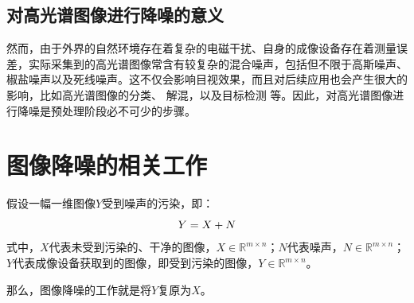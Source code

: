 \documentclass[12pt, a4paper]{article}
\begin{document}
\subsection{对高光谱图像进行降噪的意义}
\par 然而，由于外界的自然环境存在着复杂的电磁干扰、自身的成像设备存在着测量误差，实际采集到的高光谱图像常含有较复杂的混合噪声，包括但不限于高斯噪声、椒盐噪声以及死线噪声。这不仅会影响目视效果，而且对后续应用也会产生很大的影响，比如高光谱图像的分类\cite{further-use-1}、 解混\cite{further-use-2}，以及目标检测\cite{further-use-3} 等。因此，对高光谱图像进行降噪是预处理阶段必不可少的步骤。
\newpage
\section{图像降噪的相关工作}\label{research-route}
\par 假设一幅一维图像$Y$受到噪声的污染，即：
\begin{equation}
\centering
Y = X + N
\label{ori-equation}
\end{equation}
式中，$X$代表未受到污染的、干净的图像，$X \in \mathbb{R}^{m \times n}$；$N$代表噪声，$N \in \mathbb{R}^{m \times n}$；$Y$代表成像设备获取到的图像，即受到污染的图像，$Y \in \mathbb{R}^{m \times n}$。
\par 那么，图像降噪的工作就是将$Y$复原为$X$。
\end{document}
